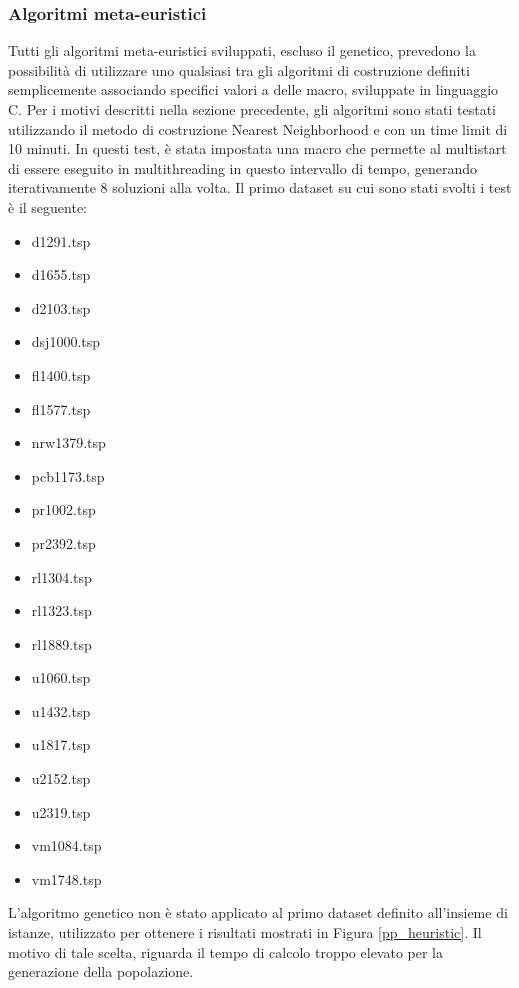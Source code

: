 \subsubsection{Algoritmi meta-euristici}
Tutti gli algoritmi meta-euristici sviluppati, escluso il genetico, prevedono la possibilità di utilizzare uno qualsiasi tra gli algoritmi di costruzione definiti semplicemente associando specifici valori a delle macro, sviluppate in linguaggio C. Per i motivi descritti nella sezione precedente, gli algoritmi sono stati testati utilizzando il metodo di costruzione Nearest Neighborhood e con un time limit di 10 minuti. In questi test, è stata impostata una macro che permette al multistart di essere eseguito in multithreading in questo intervallo di tempo, generando iterativamente 8 soluzioni alla volta. Il primo dataset su cui sono stati svolti i test è il seguente:
\begin{center}
\begin{multicols}{3}
\begin{itemize}
\item{d1291.tsp}
\item{d1655.tsp} 
\item{d2103.tsp} 
\item{dsj1000.tsp}
\item{fl1400.tsp} 
\item{fl1577.tsp} 
\item{nrw1379.tsp} 
\item{pcb1173.tsp} 
\item{pr1002.tsp}
\item{pr2392.tsp}
\item{rl1304.tsp}
\item{rl1323.tsp}
\item{rl1889.tsp}
\item{u1060.tsp} 
\item{u1432.tsp}
\item{u1817.tsp}
\item{u2152.tsp}
\item{u2319.tsp}
\item{vm1084.tsp}
\item{vm1748.tsp}
\end{itemize}
\end{multicols}
\end{center}
L'algoritmo genetico non è stato applicato al primo dataset definito all'insieme di istanze, utilizzato per ottenere i risultati mostrati in Figura \ref{pp_heuristic}. Il motivo di tale scelta, riguarda il tempo di calcolo troppo elevato per la generazione della popolazione.\\
